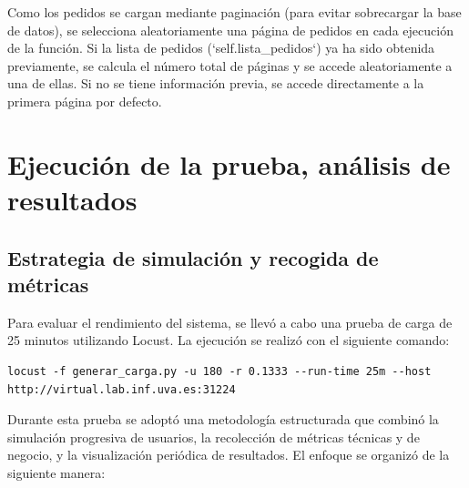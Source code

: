 \documentclass[10pt]{book}
\begin{document}
Como los pedidos se cargan mediante paginación (para evitar sobrecargar la base de datos), se selecciona aleatoriamente una página de pedidos en cada ejecución de la función. Si la lista de pedidos (`self.lista\_pedidos`) ya ha sido obtenida previamente, se calcula el número total de páginas y se accede aleatoriamente a una de ellas. Si no se tiene información previa, se accede directamente a la primera página por defecto.
                
\section{Ejecución de la prueba, análisis de resultados}

\subsection{Estrategia de simulación y recogida de métricas}
\cite{xantygc_locust}
Para evaluar el rendimiento del sistema, se llevó a cabo una prueba de carga de 25 minutos utilizando Locust. La ejecución se realizó con el siguiente comando:

\begin{lstlisting}[style=simplebash]
locust -f generar_carga.py -u 180 -r 0.1333 --run-time 25m --host http://virtual.lab.inf.uva.es:31224
\end{lstlisting}

Durante esta prueba se adoptó una metodología estructurada que combinó la simulación progresiva de usuarios, la recolección de métricas técnicas y de negocio, y la visualización periódica de resultados. El enfoque se organizó de la siguiente manera:
\end{document}
